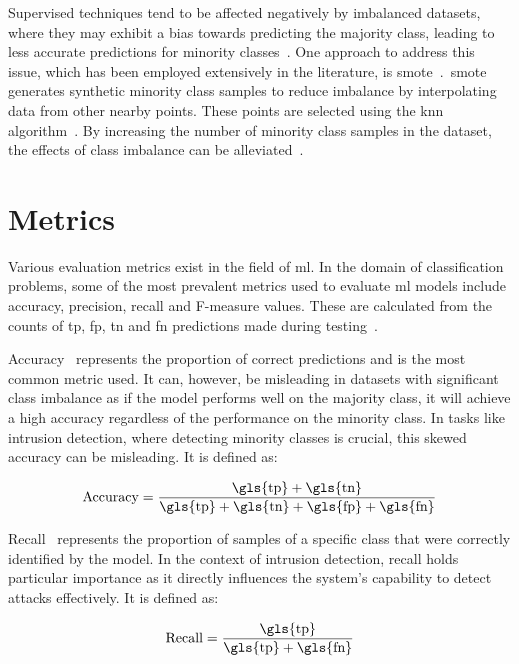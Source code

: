 
Supervised techniques tend to be affected negatively by imbalanced datasets,
where they may exhibit a bias towards predicting the majority class, leading to
less accurate predictions for minority classes~\cite{imbalance_prob,
    survey_cicids}. One approach to address this issue, which has been employed
extensively in the literature, is \gls{smote}~\cite{smote, smote_survey,
    Karatas, Jiang}.\ \gls{smote} generates synthetic minority class samples to
reduce imbalance by interpolating data from other nearby points. These points
are selected using the \gls{knn} algorithm~\cite{knn}. By increasing the number
of minority class samples in the dataset, the effects of class imbalance can be
alleviated~\cite{smote}.

\section{Metrics}%
\label{sec:metrics}

Various evaluation metrics exist in the field of \gls{ml}. In the domain of
classification problems, some of the most prevalent metrics used to evaluate
\gls{ml} models include accuracy, precision, recall and F-measure values. These
are calculated from the counts of \gls{tp}, \gls{fp}, \gls{tn} and \gls{fn}
predictions made during testing~\cite{metrics}.

Accuracy~\cite{metrics} represents the proportion of correct predictions and is
the most common metric used. It can, however, be misleading in datasets with
significant class imbalance as if the model performs well on the majority
class, it will achieve a high accuracy regardless of the performance on the
minority class. In tasks like intrusion detection, where detecting minority
classes is crucial, this skewed accuracy can be misleading. It is defined as:

\[ \text{Accuracy} = \frac{\text{\gls{tp}}+\text{\gls{tn}}}{\text{\gls{tp}}+\text{\gls{tn}}+\text{\gls{fp}}+\text{\gls{fn}}} \]

Recall~\cite{metrics} represents the proportion of samples of a specific class
that were correctly identified by the model. In the context of intrusion
detection, recall holds particular importance as it directly influences the
system's capability to detect attacks effectively. It is defined as:

\[ \text{Recall} = \frac{\text{\gls{tp}}}{\text{\gls{tp}}+\text{\gls{fn}}} \]

